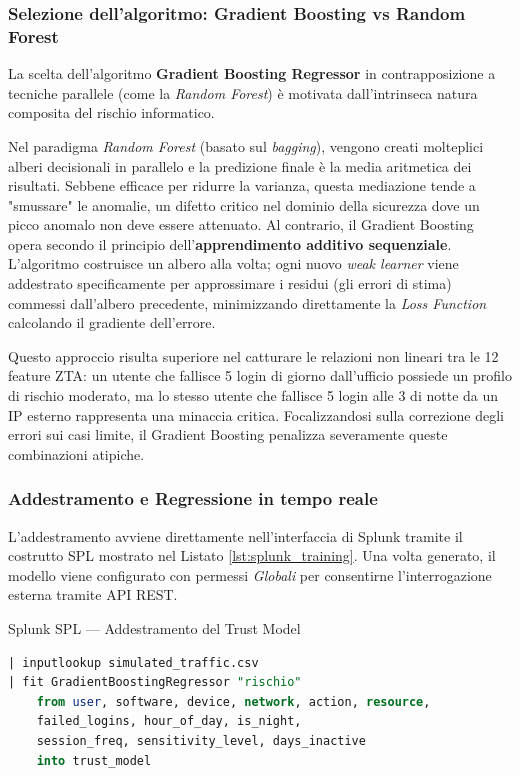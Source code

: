 \subsubsection{Selezione dell'algoritmo: Gradient Boosting vs Random Forest}
La scelta dell'algoritmo \textbf{Gradient Boosting Regressor} in contrapposizione a tecniche parallele (come la \textit{Random Forest}) è motivata dall'intrinseca natura composita del rischio informatico. 

Nel paradigma \textit{Random Forest} (basato sul \textit{bagging}), vengono creati molteplici alberi decisionali in parallelo e la predizione finale è la media aritmetica dei risultati. Sebbene efficace per ridurre la varianza, questa mediazione tende a "smussare" le anomalie, un difetto critico nel dominio della sicurezza dove un picco anomalo non deve essere attenuato.
Al contrario, il Gradient Boosting opera secondo il principio dell'\textbf{apprendimento additivo sequenziale}. L'algoritmo costruisce un albero alla volta; ogni nuovo \textit{weak learner} viene addestrato specificamente per approssimare i residui (gli errori di stima) commessi dall'albero precedente, minimizzando direttamente la \textit{Loss Function} calcolando il gradiente dell'errore. 

Questo approccio risulta superiore nel catturare le relazioni non lineari tra le 12 feature ZTA: un utente che fallisce 5 login di giorno dall'ufficio possiede un profilo di rischio moderato, ma lo stesso utente che fallisce 5 login alle 3 di notte da un IP esterno rappresenta una minaccia critica. Focalizzandosi sulla correzione degli errori sui casi limite, il Gradient Boosting penalizza severamente queste combinazioni atipiche.

\subsubsection{Addestramento e Regressione in tempo reale}
L'addestramento avviene direttamente nell'interfaccia di Splunk tramite il costrutto SPL mostrato nel Listato \ref{lst:splunk_training}. Una volta generato, il modello viene configurato con permessi \textit{Globali} per consentirne l'interrogazione esterna tramite API REST.

\begin{center}
\begin{minipage}{\linewidth}
\begin{ztacodebox}{Splunk SPL — Addestramento del Trust Model}
\begin{lstlisting}[language=SQL]
| inputlookup simulated_traffic.csv
| fit GradientBoostingRegressor "rischio"
    from user, software, device, network, action, resource,
    failed_logins, hour_of_day, is_night,
    session_freq, sensitivity_level, days_inactive
    into trust_model
\end{lstlisting}
\end{ztacodebox}
\label{lst:splunk_training}
\end{minipage}
\end{center}

